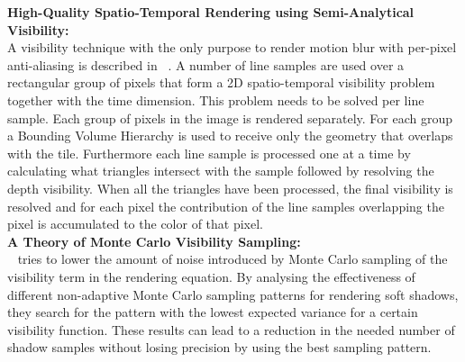 \textbf{High-Quality Spatio-Temporal Rendering using Semi-Analytical Visibility:} \\
A visibility technique with the only purpose to render motion blur with per-pixel anti-aliasing is described in ~\cite{Gribel2011}.
A number of line samples are used over a rectangular group of pixels that form a 2D spatio-temporal visibility problem together with the time dimension.
This problem needs to be solved per line sample.
Each group of pixels in the image is rendered separately.
For each group a Bounding Volume Hierarchy is used to receive only the geometry that overlaps with the tile. 
Furthermore each line sample is processed one at a time by calculating what triangles intersect with the sample followed by resolving the depth visibility.
When all the triangles have been processed, the final visibility is resolved and for each pixel the contribution of the line samples overlapping the pixel is accumulated to the color of that pixel.
\\

\textbf{A Theory of Monte Carlo Visibility Sampling:} \\
~\cite{Ramamoorthi:2012:ATO} tries to lower the amount of noise introduced by Monte Carlo sampling of the visibility term in the rendering equation.
By analysing the effectiveness of different non-adaptive Monte Carlo sampling patterns for rendering soft shadows, 
they search for the pattern with the lowest expected variance for a certain visibility function.
These results can lead to a reduction in the needed number of shadow samples without losing precision by using the best sampling pattern.
\\